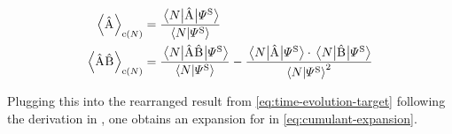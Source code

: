 \begin{equation}
    \label{eq:cumulant-expansion-coefficients}
    \begin{split}
        \left\langle\Aop\right\rangle_{\text{c}(N)} &= \frac{ \bracketHelper{N}{\Aop}{\picturePsi[\schroedingerPicture]{}}}{\braketHelper{N}{\picturePsi[\schroedingerPicture]{}}}\\
        \left\langle\Aop\Bop\right\rangle_{\text{c}(N)} &= \frac{\bracketHelper{N}{\Aop\Bop}{\picturePsi[\schroedingerPicture]{}}}{\braketHelper{N}{\picturePsi[\schroedingerPicture]{}}} -  \frac{\bracketHelper{N}{\Aop}{\picturePsi[\schroedingerPicture]{}} \cdot \bracketHelper{N}{\Bop}{\picturePsi[\schroedingerPicture]{}}}{\braketHelper{N}{\picturePsi[\schroedingerPicture]{}}^2}\\
    \end{split}
\end{equation}

Plugging this into the rearranged result from \autoref{eq:time-evolution-target} following the derivation in \cite{variationalClassicalNetworksPaper}, one obtains an expansion for \HNOft in \autoref{eq:cumulant-expansion}.

